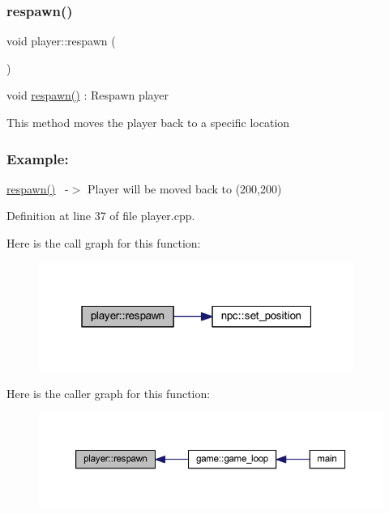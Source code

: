 \subsubsection{\texorpdfstring{respawn()}{respawn()}}
{\footnotesize\ttfamily void player\+::respawn (\begin{DoxyParamCaption}{ }\end{DoxyParamCaption})}



void \hyperlink{classplayer_a519784459639f6b785bcfeaa05b6f604}{respawn()} \+: Respawn player 

This method moves the player back to a specific location ~\newline
 \subsubsection*{Example\+: }

\hyperlink{classplayer_a519784459639f6b785bcfeaa05b6f604}{respawn()}~\newline
-\/$>$ Player will be moved back to (200,200) 

Definition at line 37 of file player.\+cpp.

Here is the call graph for this function\+:
\nopagebreak
\begin{figure}[H]
\begin{center}
\leavevmode
\includegraphics[width=292pt]{classplayer_a519784459639f6b785bcfeaa05b6f604_cgraph}
\end{center}
\end{figure}
Here is the caller graph for this function\+:
\nopagebreak
\begin{figure}[H]
\begin{center}
\leavevmode
\includegraphics[width=350pt]{classplayer_a519784459639f6b785bcfeaa05b6f604_icgraph}
\end{center}
\end{figure}
\mbox{\label{classplayer_aa673c84d7b56badc58d7c467325cbf88}} 
